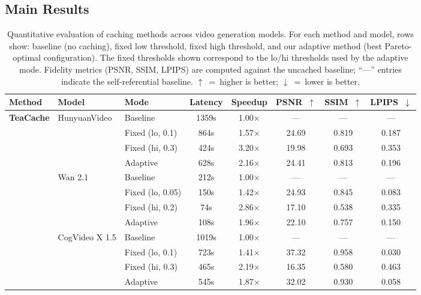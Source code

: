 \subsection{Main Results}

\begin{table}[t]
\centering
\small
\caption{Quantitative evaluation of caching methods across video generation models. For each method and model, rows show: baseline (no caching), fixed low threshold, fixed high threshold, and our adaptive method (best Pareto-optimal configuration). The fixed thresholds shown correspond to the lo/hi thresholds used by the adaptive mode. Fidelity metrics (PSNR, SSIM, LPIPS) are computed against the uncached baseline; ``---'' entries indicate the self-referential baseline. $\uparrow$~=~higher is better; $\downarrow$~=~lower is better.}
\label{tab:main_results}
\renewcommand{\arraystretch}{1.1}
\begin{tabular}{lllccccc}
\toprule
\textbf{Method} & \textbf{Model} & \textbf{Mode} & \textbf{Latency} & \textbf{Speedup} & \textbf{PSNR~$\uparrow$} & \textbf{SSIM~$\uparrow$} & \textbf{LPIPS~$\downarrow$} \\
\midrule

\multirow{12}{*}{\textbf{TeaCache}}
  & \multirow{4}{*}{HunyuanVideo}
    & Baseline          & 1359s & 1.00$\times$ & ---   & ---   & ---   \\
  & & Fixed (lo, 0.1)   & 864s  & 1.57$\times$ & 24.69 & 0.819 & 0.187 \\
  & & Fixed (hi, 0.3)   & 424s  & 3.20$\times$ & 19.98 & 0.693 & 0.353 \\
  & & Adaptive          & 628s  & 2.16$\times$ & 24.41 & 0.813 & 0.196 \\
\cmidrule{2-8}
  & \multirow{4}{*}{Wan 2.1}
    & Baseline          & 212s  & 1.00$\times$ & ---   & ---   & ---   \\
  & & Fixed (lo, 0.05)  & 150s & 1.42$\times$ & 24.93 & 0.845 & 0.083 \\
  & & Fixed (hi, 0.2)   & 74s   & 2.86$\times$ & 17.10 & 0.538 & 0.335 \\
  & & Adaptive          & 108s  & 1.96$\times$ & 22.10 & 0.757 & 0.150 \\
\cmidrule{2-8}
  & \multirow{4}{*}{CogVideo X 1.5}
    & Baseline          & 1019s & 1.00$\times$ & ---   & ---   & ---   \\
  & & Fixed (lo, 0.1)   & 723s  & 1.41$\times$ & 37.32 & 0.958 & 0.030 \\
  & & Fixed (hi, 0.3)   & 465s  & 2.19$\times$ & 16.35 & 0.580 & 0.463 \\
  & & Adaptive          & 545s  & 1.87$\times$ & 32.02 & 0.930 & 0.058 \\
\midrule


\end{tabular}
\end{table}

